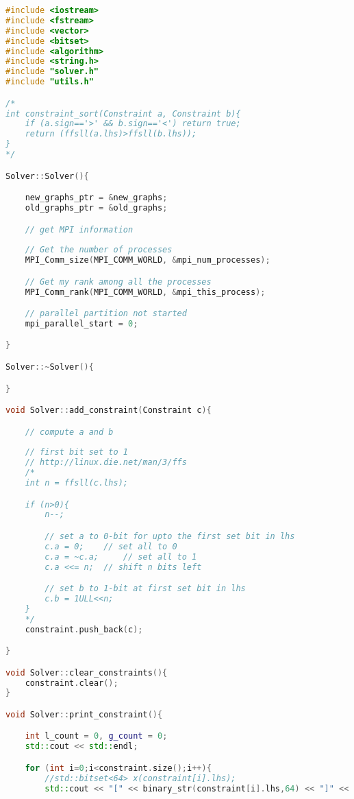 \documentclass[12pt]{etsu_thesis}
\begin{document}

\begin{lstlisting}[language=C++]
#include <iostream>
#include <fstream>
#include <vector>
#include <bitset>
#include <algorithm>
#include <string.h>
#include "solver.h"
#include "utils.h"

/*
int constraint_sort(Constraint a, Constraint b){
	if (a.sign=='>' && b.sign=='<') return true;
	return (ffsll(a.lhs)>ffsll(b.lhs));
}
*/

Solver::Solver(){

    new_graphs_ptr = &new_graphs;
    old_graphs_ptr = &old_graphs;

    // get MPI information
    
    // Get the number of processes
    MPI_Comm_size(MPI_COMM_WORLD, &mpi_num_processes); 

    // Get my rank among all the processes
    MPI_Comm_rank(MPI_COMM_WORLD, &mpi_this_process);     

    // parallel partition not started
    mpi_parallel_start = 0;

}

Solver::~Solver(){

}

void Solver::add_constraint(Constraint c){

	// compute a and b
	
	// first bit set to 1
	// http://linux.die.net/man/3/ffs
	/*
    int n = ffsll(c.lhs);

	if (n>0){
		n--;

		// set a to 0-bit for upto the first set bit in lhs
		c.a = 0;	// set all to 0
		c.a = ~c.a;		// set all to 1
		c.a <<= n;	// shift n bits left

		// set b to 1-bit at first set bit in lhs
		c.b = 1ULL<<n;
	}
    */
    constraint.push_back(c);

}

void Solver::clear_constraints(){
    constraint.clear();
}

void Solver::print_constraint(){

    int l_count = 0, g_count = 0;
    std::cout << std::endl;

	for (int i=0;i<constraint.size();i++){
		//std::bitset<64> x(constraint[i].lhs);
		std::cout << "[" << binary_str(constraint[i].lhs,64) << "]" << constraint[i].sign << constraint[i].rhs << std::endl;


\end{lstlisting}
\end{document}
